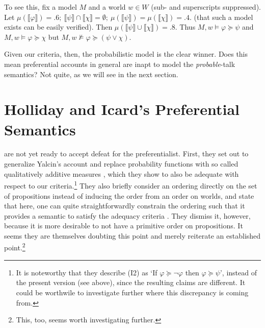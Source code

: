 \documentclass{article}
\theoremstyle{definition}
\newcommand{\lb}{\llbracket}
\newcommand{\rb}{\rrbracket}
\begin{document}
\noindent To see this, fix a model $M$ and a world $w \in W$ (sub- and superscripts suppressed).
Let $\mu(\lb\varphi\rb) = .6;~ \lb\psi\rb \cap \lb\chi\rb=\emptyset;~ \mu(\lb\psi\rb) = \mu(\lb\chi\rb) = .4$. (that such a model exists can be easily verified).
Then $\mu(\lb \psi \rb \cup \lb \chi \rb) = .8$.
Thus $M,w \models \varphi \succeq \psi$ and $ M,w \models \varphi \succeq \chi$ but $M,w \not\models \varphi \succeq (\psi \lor \chi)$.

Given our criteria, then, the probabilistic model is the clear winner.
Does this
mean preferential accounts in general are inapt to model the
\emph{probable}-talk semantics?
Not quite, as we will see in the next section.

\section{Holliday and Icard's Preferential Semantics}

\textcite{holliday13_measur} are not yet ready to accept defeat for the preferentialist. First, they set out to generalize Yalcin's account and replace probability functions with so called qualitatively additive measures \parencite[][p.~522]{holliday13_measur}, which they show to also be adequate with respect to our criteria.\footnote{It is noteworthy that they describe (I2) as `If $\varphi \succeq \neg \varphi$ then $\varphi \succeq \psi$', instead of the present version (see above), since the resulting claims are different. It could be worthwile to investigate further where this discrepancy is coming from.}
They also briefly consider an ordering directly on the set of propositions instead of inducing the order from an order on worlds, and state that here, one can quite straightforwardly constrain the ordering such that it provides a semantic to satisfy the adequacy criteria \parencite[p.~924]{holliday13_measur}.
They dismiss it, however, because it is more desirable to not have a primitive order on propositions.
It seems they are themselves doubting this point and merely reiterate an established point.\footnote{This, too, seems worth investigating further.}
\end{document}
